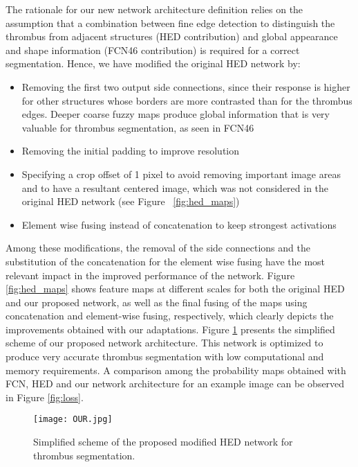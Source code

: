 \documentclass[preprint,authoryear,12pt]{elsarticle}
\begin{document}
The rationale for our new network architecture definition relies on the assumption that a combination between fine edge detection to distinguish the thrombus from adjacent structures (HED contribution) and global appearance and shape information (FCN46 contribution) is required for a correct segmentation. Hence, we have modified the original HED network by:

\begin{itemize}
\item Removing the first two output side connections, since their response is higher for other structures whose borders are more contrasted than for the thrombus edges. Deeper coarse fuzzy maps produce global information that is very valuable for thrombus segmentation, as seen in FCN46
\item Removing the initial padding to improve resolution
\item Specifying a crop offset of 1 pixel to avoid removing important image areas and to have a resultant centered image, which was not considered in the original HED network (see Figure ~\ref{fig:hed_maps})
\item Element wise fusing instead of concatenation to keep strongest activations 
\end{itemize}


Among these modifications, the removal of the side connections and the substitution of the concatenation for the element wise fusing have the most relevant impact in the improved performance of the network. Figure \ref{fig:hed_maps} shows feature maps at different scales for both the original HED and our proposed network, as well as the final fusing of the maps using concatenation and element-wise fusing, respectively, which clearly depicts the improvements obtained with our adaptations. Figure \ref{fig:hed_modif} presents the simplified scheme of our proposed network architecture.
This network is optimized to produce very accurate thrombus segmentation with low computational and memory requirements. A comparison among the probability maps obtained with FCN, HED and our network architecture for an example image can be observed in Figure \ref{fig:loss}. \par  

\begin{figure}[htb]
\centering
\texttt{[image: OUR.jpg]}
\caption{\label{fig:hed_modif}Simplified scheme of the proposed modified HED network for thrombus segmentation.}
\end{figure}
\end{document}
